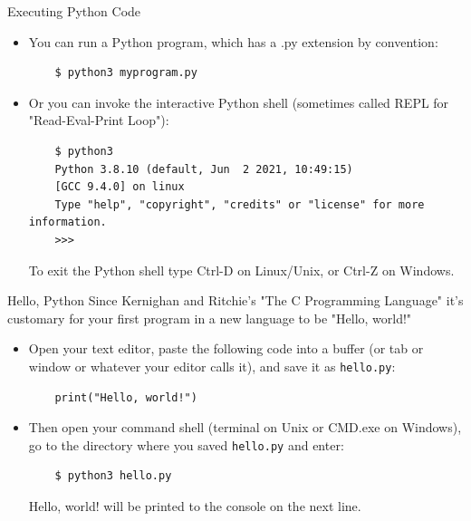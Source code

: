 \documentclass[smaller, aspectratio=1610]{beamer}
\begin{document}
\begin{frame}[label={sec:orgf1b2c0b},fragile]{Executing Python Code}
 \begin{itemize}
\item You can run a Python program, which has a .py extension by convention:

\lstset{language=sh,label= ,caption= ,captionpos=b,numbers=none}
\begin{lstlisting}
    $ python3 myprogram.py
\end{lstlisting}

\item Or you can invoke the interactive Python shell (sometimes called REPL for "Read-Eval-Print Loop"):

\lstset{language=sh,label= ,caption= ,captionpos=b,numbers=none}
\begin{lstlisting}
    $ python3
    Python 3.8.10 (default, Jun  2 2021, 10:49:15)
    [GCC 9.4.0] on linux
    Type "help", "copyright", "credits" or "license" for more information.
    >>>
\end{lstlisting}

To exit the Python shell type Ctrl-D on Linux/Unix, or Ctrl-Z on Windows.
\end{itemize}
\end{frame}

\begin{frame}[label={sec:org59a86c8},fragile]{Hello, Python}
 Since Kernighan and Ritchie's "The C Programming Language" it's customary for your first program in a new language to be "Hello, world!"

\begin{itemize}
\item Open your text editor, paste the following code into a buffer (or tab or window or whatever your editor calls it), and save it as \texttt{hello.py}:

\lstset{language=Python,label= ,caption= ,captionpos=b,numbers=none}
\begin{lstlisting}
    print("Hello, world!")
\end{lstlisting}

\item Then open your command shell (terminal on Unix or CMD.exe on Windows), go to the directory where you saved \texttt{hello.py} and enter:

\lstset{language=sh,label= ,caption= ,captionpos=b,numbers=none}
\begin{lstlisting}
    $ python3 hello.py
\end{lstlisting}

Hello, world! will be printed to the console on the next line.
\end{itemize}
\end{frame}
\end{document}
